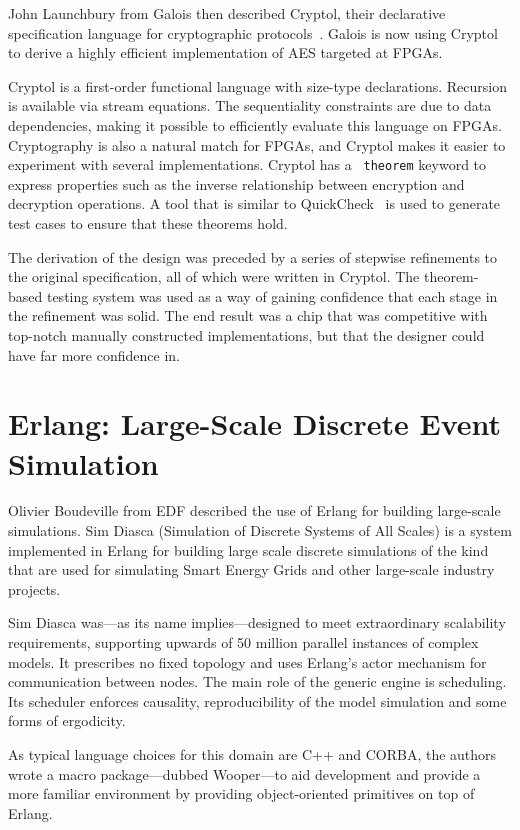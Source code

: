 \documentclass{jfp1}
\begin{document}
John Launchbury from Galois then described Cryptol, their declarative
specification language for cryptographic
protocols~\cite{Erkok:2009:PES:1481848.1481860}.  Galois is now using Cryptol
to derive a highly efficient implementation of AES targeted at FPGAs.

Cryptol is a first-order functional language with size-type declarations.
Recursion is available via stream equations.  The sequentiality constraints are
due to data dependencies, making it possible to efficiently evaluate this
language on FPGAs. Cryptography is also a natural match for FPGAs, and Cryptol
makes it easier to experiment with several implementations. Cryptol has a {\tt
theorem} keyword to express properties such as the inverse relationship between
encryption and decryption operations. A tool that is similar to
QuickCheck~\cite{Claessen:2000:QLT:351240.351266} is used to generate test
cases to ensure that these theorems hold.

The derivation of the design was preceded by a series of stepwise refinements to
the original specification, all of which were written in Cryptol.  The
theorem-based testing system was used as a way of gaining confidence that each
stage in the refinement was solid.  The end result was a chip that was
competitive with top-notch manually constructed implementations, but that the
designer could have far more confidence in.

\section{Erlang: Large-Scale Discrete Event Simulation}

Olivier Boudeville from EDF described the use of Erlang for building
large-scale simulations.  Sim Diasca (Simulation of Discrete Systems of All
Scales) is a system implemented in Erlang for building large scale discrete
simulations of the kind that are used for simulating Smart Energy Grids and
other large-scale industry projects.

Sim Diasca was---as its name implies---designed to meet extraordinary
scalability requirements, supporting upwards of 50 million parallel instances
of complex models.  It prescribes no fixed topology and uses Erlang's actor
mechanism for communication between nodes.  The main role of the generic engine
is scheduling.  Its scheduler enforces causality, reproducibility of the model
simulation and some forms of ergodicity.

As typical language choices for this domain are C++ and CORBA, the authors
wrote a macro package---dubbed Wooper---to aid development and provide a
more familiar environment by providing object-oriented primitives on top of
Erlang.
\end{document}
